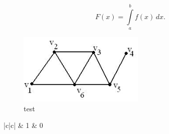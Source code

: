 \documentclass[nir, och, master]{SCWorks}
\begin{document}
\begin{equation}
  F(x)=\int\limits_a^bf(x)\,dx.
\end{equation}


\begin{figure}[!ht]
	\centering
	\includegraphics[width=6cm]{fig2.png}
	\caption{\label{fig:f3}%
	test}
\end{figure}


\begin{table}[!ht]
\caption{}
\begin{tabular}{|c|c|}
   & 1\cr
   & 0\cr
  \hline
\end{tabular}
\end{table} 


\end{document}
